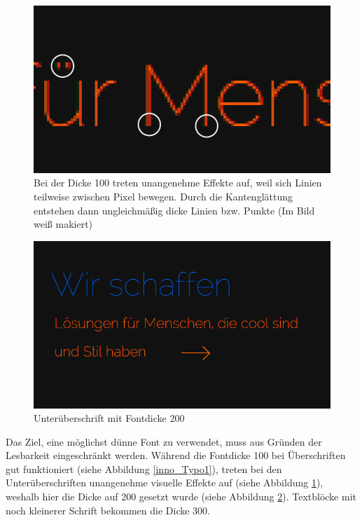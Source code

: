         \begin{figure} [htp]
\includegraphics[width=\textwidth]{./img/inno_typo1_2.png}
\caption{Bei der Dicke 100 treten unangenehme Effekte auf, weil sich Linien teilweise zwischen Pixel bewegen. Durch die Kantenglättung entstehen dann ungleichmäßig dicke Linien bzw. Punkte (Im Bild weiß makiert)}
\label{inno_Typo12}
\end{figure}

\begin{figure} [htp]
\includegraphics[width=\textwidth]{./img/inno_typo2.png}
\caption{Unterüberschrift mit Fontdicke 200}
\label{inno_Typo2}
\end{figure}
Das Ziel, eine möglichst dünne Font zu verwendet, muss aus Gründen der Lesbarkeit eingeschränkt werden. Während die Fontdicke 100 bei Überschriften gut funktioniert (siehe Abbildung \ref{inno_Typo1}), treten bei den Unterüberschriften unangenehme visuelle Effekte auf (siehe Abbildung \ref{inno_Typo12}), weshalb hier die Dicke auf 200 gesetzt wurde (siehe Abbildung \ref{inno_Typo2}). Textblöcke mit noch kleinerer Schrift bekommen die Dicke 300.


